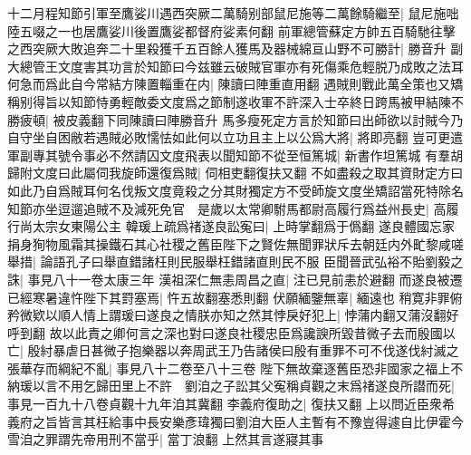 十二月程知節引軍至鷹娑川遇西突厥二萬騎别部鼠尼施等二萬餘騎繼至|{
	鼠尼施咄陸五啜之一也居鷹娑川後置鷹娑都督府娑素何翻}
前軍總管蘇定方帥五百騎馳往擊之西突厥大敗追奔二十里殺獲千五百餘人獲馬及器械綿亘山野不可勝計|{
	勝音升}
副大總管王文度害其功言於知節曰今兹雖云破賊官軍亦有死傷乘危輕脱乃成敗之法耳何急而爲此自今常結方陳置輜重在内|{
	陳讀曰陣重直用翻}
遇賊則戰此萬全策也又矯稱别得旨以知節恃勇輕敵委文度爲之節制遂收軍不許深入士卒終日跨馬被甲結陳不勝疲頓|{
	被皮義翻下同陳讀曰陣勝音升}
馬多瘦死定方言於知節曰出師欲以討賊今乃自守坐自困敝若遇賊必敗懦怯如此何以立功且主上以公爲大將|{
	將即亮翻}
豈可更遣軍副專其號令事必不然請囚文度飛表以聞知節不從至恒篤城|{
	新書作坦篤城}
有羣胡歸附文度曰此屬伺我旋師還復爲賊|{
	伺相吏翻復扶又翻}
不如盡殺之取其資財定方曰如此乃自爲賊耳何名伐叛文度竟殺之分其財獨定方不受師旋文度坐矯詔當死特除名知節亦坐逗遛追賊不及減死免官　是歲以太常卿駙馬都尉高履行爲益州長史|{
	高履行尚太宗女東陽公主}
韓瑗上疏爲禇遂良訟寃曰|{
	上時掌翻爲于僞翻}
遂良體國忘家捐身狥物風霜其操鐵石其心社稷之舊臣陛下之賢佐無聞罪狀斥去朝廷内外甿黎咸嗟舉措|{
	論語孔子曰舉直錯諸枉則民服舉枉錯諸直則民不服}
臣聞晉武弘裕不貽劉毅之誅|{
	事見八十一卷太康三年}
漢祖深仁無恚周昌之直|{
	注已見前恚於避翻}
而遂良被遷已經寒暑違忤陛下其罸塞焉|{
	忤五故翻塞悉則翻}
伏願緬鑒無辜|{
	緬遠也}
稍寛非罪俯矜微欵以順人情上謂瑗曰遂良之情朕亦知之然其悖戾好犯上|{
	悖蒲内翻又蒲沒翻好呼到翻}
故以此責之卿何言之深也對曰遂良社稷忠臣爲讒諛所毀昔微子去而殷國以亡|{
	殷紂暴虐日甚微子抱樂器以奔周武王乃告諸侯曰殷有重罪不可不伐遂伐紂滅之}
張華存而綱紀不亂|{
	事見八十二卷至八十三卷}
陛下無故棄逐舊臣恐非國家之福上不納瑗以言不用乞歸田里上不許　劉洎之子訟其父寃稱貞觀之末爲禇遂良所譛而死|{
	事見一百九十八卷貞觀十九年洎其冀翻}
李義府復助之|{
	復扶又翻}
上以問近臣衆希義府之旨皆言其枉給事中長安樂彥瑋獨曰劉洎大臣人主暫有不豫豈得遽自比伊霍今雪洎之罪謂先帝用刑不當乎|{
	當丁浪翻}
上然其言遂寢其事

